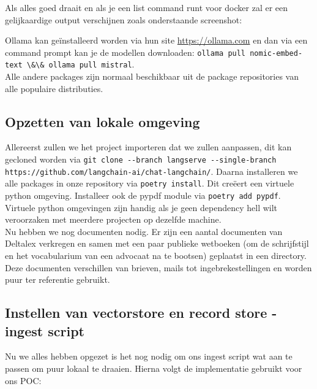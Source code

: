 Als alles goed draait en als je een list command runt voor docker zal er een gelijkaardige output verschijnen zoals onderstaande screenshot:
\begin{figure}[h]
\end{figure}

Ollama kan geïnstalleerd worden via hun site \url{https://ollama.com} en dan via een command prompt kan je de modellen downloaden: \lstinline{ollama pull nomic-embed-text \&\& ollama pull mistral}. \\

Alle andere packages zijn normaal beschikbaar uit de package repositories van alle populaire distributies.

\subsection{Opzetten van lokale omgeving}
Allereerst zullen we het project importeren dat we zullen aanpassen, dit kan gecloned worden via \lstinline{git clone --branch langserve --single-branch https://github.com/langchain-ai/chat-langchain/}.
Daarna installeren we alle packages in onze repository via \lstinline{poetry install}. Dit creëert een virtuele python omgeving. Installeer ook de pypdf module via \lstinline{poetry add pypdf}.
Virtuele python omgevingen zijn handig als je geen dependency hell wilt veroorzaken met meerdere projecten op dezelfde machine. \\

Nu hebben we nog documenten nodig.
Er zijn een aantal documenten van Deltalex verkregen en samen met een paar publieke wetboeken (om de schrijfstijl en het vocabularium van een advocaat na te bootsen) geplaatst in een directory.
Deze documenten verschillen van brieven, mails tot ingebrekestellingen en worden puur ter referentie gebruikt.

\subsection{Instellen van vectorstore en record store - ingest script}
Nu we alles hebben opgezet is het nog nodig om ons ingest script wat aan te passen om puur lokaal te draaien. Hierna volgt de implementatie gebruikt voor ons POC:
\newpage

